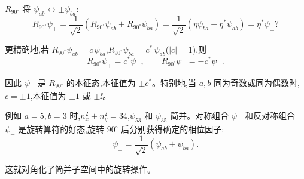 \begin{solution}
	$R_{90^\circ}$ 将 $\psi_{ab}\leftrightarrow\pm\psi_{ba}$:
	\[
	R_{90^\circ}\psi_+ = \frac{1}{\sqrt{2}}(R_{90^\circ}\psi_{ab}+R_{90^\circ}\psi_{ba})
	= \frac{1}{\sqrt{2}}(\eta\psi_{ba}+\eta^*\psi_{ab}) = \eta^*\psi_\pm?
	\]

	更精确地,若 $R_{90^\circ}\psi_{ab} = c\,\psi_{ba}$,$R_{90^\circ}\psi_{ba} = c^*\,\psi_{ab}$($|c|=1$),则
	\[
	R_{90^\circ}\psi_+ = c^*\psi_+,\qquad
	R_{90^\circ}\psi_- = -c^*\psi_-.
	\]

	因此 $\psi_\pm$ 是 $R_{90^\circ}$ 的本征态,本征值为 $\pm c^*$。特别地,当 $a,b$ 同为奇数或同为偶数时,$c=\pm1$,本征值为 $\pm1$ 或 $\pm\ii$。

	例如 $a=5,b=3$ 时,$n_x^2+n_y^2=34$,$\psi_{53}$ 和 $\psi_{35}$ 简并。对称组合 $\psi_+$ 和反对称组合 $\psi_-$ 是旋转算符的好态,旋转 $90^\circ$ 后分别获得确定的相位因子:
	\[
	\boxed{\psi_\pm = \frac{1}{\sqrt{2}}(\psi_{ab}\pm\psi_{ba})}.
	\]

	这就对角化了简并子空间中的旋转操作。
	\end{solution}

